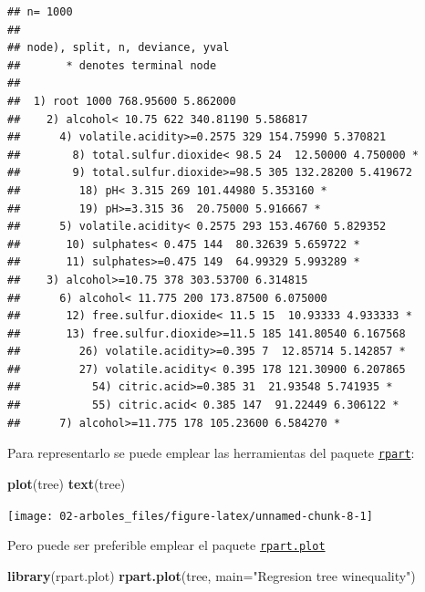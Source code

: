 \documentclass[
]{book}
\newenvironment{Shaded}{\begin{snugshade}}{\end{snugshade}}
\newcommand{\DataTypeTok}[1]{\textcolor[rgb]{0.13,0.29,0.53}{#1}}
\newcommand{\KeywordTok}[1]{\textcolor[rgb]{0.13,0.29,0.53}{\textbf{#1}}}
\newcommand{\NormalTok}[1]{#1}
\newcommand{\StringTok}[1]{\textcolor[rgb]{0.31,0.60,0.02}{#1}}
\theoremstyle{break}
\theoremstyle{definition}
\theoremstyle{definition}
\theoremstyle{definition}
\theoremstyle{remark}
\begin{document}
\begin{verbatim}
## n= 1000 
## 
## node), split, n, deviance, yval
##       * denotes terminal node
## 
##  1) root 1000 768.95600 5.862000  
##    2) alcohol< 10.75 622 340.81190 5.586817  
##      4) volatile.acidity>=0.2575 329 154.75990 5.370821  
##        8) total.sulfur.dioxide< 98.5 24  12.50000 4.750000 *
##        9) total.sulfur.dioxide>=98.5 305 132.28200 5.419672  
##         18) pH< 3.315 269 101.44980 5.353160 *
##         19) pH>=3.315 36  20.75000 5.916667 *
##      5) volatile.acidity< 0.2575 293 153.46760 5.829352  
##       10) sulphates< 0.475 144  80.32639 5.659722 *
##       11) sulphates>=0.475 149  64.99329 5.993289 *
##    3) alcohol>=10.75 378 303.53700 6.314815  
##      6) alcohol< 11.775 200 173.87500 6.075000  
##       12) free.sulfur.dioxide< 11.5 15  10.93333 4.933333 *
##       13) free.sulfur.dioxide>=11.5 185 141.80540 6.167568  
##         26) volatile.acidity>=0.395 7  12.85714 5.142857 *
##         27) volatile.acidity< 0.395 178 121.30900 6.207865  
##           54) citric.acid>=0.385 31  21.93548 5.741935 *
##           55) citric.acid< 0.385 147  91.22449 6.306122 *
##      7) alcohol>=11.775 178 105.23600 6.584270 *
\end{verbatim}

Para representarlo se puede emplear las herramientas del paquete \href{https://CRAN.R-project.org/package=rpart}{\texttt{rpart}}:

\begin{Shaded}
\begin{Highlighting}[]
\KeywordTok{plot}\NormalTok{(tree)}
\KeywordTok{text}\NormalTok{(tree)}
\end{Highlighting}
\end{Shaded}

\begin{center}\texttt{[image: 02-arboles\_files/figure-latex/unnamed-chunk-8-1]} \end{center}

Pero puede ser preferible emplear el paquete \href{https://CRAN.R-project.org/package=rpart.plot}{\texttt{rpart.plot}}

\begin{Shaded}
\begin{Highlighting}[]
\KeywordTok{library}\NormalTok{(rpart.plot)}
\KeywordTok{rpart.plot}\NormalTok{(tree, }\DataTypeTok{main=}\StringTok{"Regresion tree winequality"}\NormalTok{)  }
\end{Highlighting}
\end{Shaded}
\end{document}
